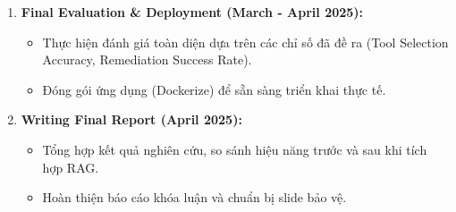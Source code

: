 \begin{enumerate}
    \item \textbf{Final Evaluation \& Deployment (March - April 2025):}
    \begin{itemize}
        \item Thực hiện đánh giá toàn diện dựa trên các chỉ số đã đề ra (Tool Selection Accuracy, Remediation Success Rate).
        \item Đóng gói ứng dụng (Dockerize) để sẵn sàng triển khai thực tế.
    \end{itemize}

    \item \textbf{Writing Final Report (April 2025):}
    \begin{itemize}
        \item Tổng hợp kết quả nghiên cứu, so sánh hiệu năng trước và sau khi tích hợp RAG.
        \item Hoàn thiện báo cáo khóa luận và chuẩn bị slide bảo vệ.
    \end{itemize}
\end{enumerate}